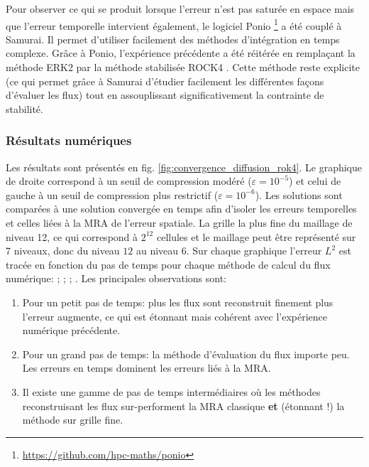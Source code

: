 \label{par:etude_diff_rock4}
Pour observer ce qui se produit lorsque l'erreur n'est pas saturée en espace mais que l'erreur temporelle intervient également, 
le logiciel Ponio \footnote{\href{https://github.com/hpc-maths/ponio}{https://github.com/hpc-maths/ponio}} a été couplé à Samurai.
Il permet d'utiliser facilement des méthodes d'intégration en temps complexe. 
Grâce à Ponio, l'expérience précédente a été réitérée en remplaçant la méthode ERK2 par la méthode stabilisée ROCK4 \cite{AbdulleMedovikov2001}. 
Cette méthode reste explicite (ce qui permet grâce à Samurai d'étudier facilement les différentes façons d'évaluer les flux) 
tout en assouplissant significativement la contrainte de stabilité.
\subsubsection{Résultats numériques}
    Les résultats sont présentés en fig. \ref{fig:convergence_diffusion_rok4}.
    Le graphique de droite correspond à un seuil de compression modéré ($\varepsilon = 10^{-5}$) et celui de gauche à un seuil de compression plus restrictif ($\varepsilon = 10^{-6}$).
    Les solutions sont comparées à une solution convergée en temps afin d'isoler les erreurs temporelles et celles liées à la MRA de l'erreur spatiale.
    La grille la plus fine du maillage de niveau 12, ce qui correspond à $2^{12}$ cellules et le maillage peut être représenté sur 7 niveaux, donc du niveau $12$ au niveau $6$.
    Sur chaque graphique l'erreur $L^2$ est tracée en fonction du pas de temps pour chaque méthode de calcul du flux numérique:
{} ;
{} ;
{} ;
{}.
    Les principales observations sont:
    \begin{enumerate}
        \item Pour un petit pas de temps: plus les flux sont reconstruit finement plus l'erreur augmente, ce qui est étonnant mais cohérent avec l'expérience numérique précédente.
        \item Pour un grand pas de temps: la méthode d'évaluation du flux importe peu. Les erreurs en temps dominent les erreurs liés à la MRA.
        \item Il existe une gamme de pas de temps intermédiaires où les méthodes reconstruisant les flux sur-performent la MRA classique \textbf{et} (étonnant !) la méthode sur grille fine.
    \end{enumerate}
